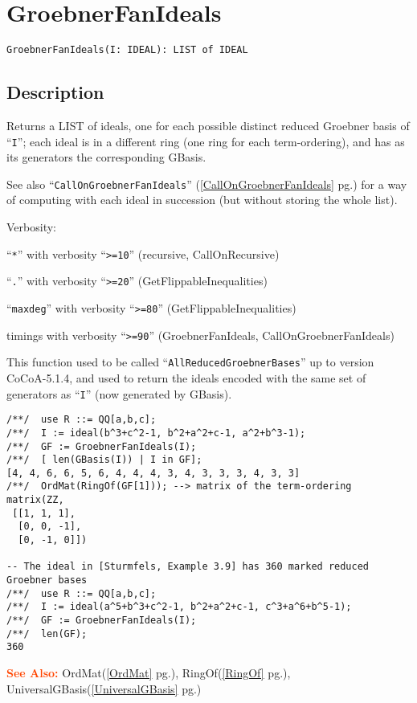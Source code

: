 \documentclass[a4paper]{mybook}
\newenvironment{command}{}{} %
\newcommand\SeeAlso{\par\textcolor{OrangeRed}{\textbf{\large See Also: }}}
\begin{document}
\section{GroebnerFanIdeals}
\label{GroebnerFanIdeals}
\begin{command} %


\begin{Verbatim}[label=syntax, rulecolor=\color{MidnightBlue},
frame=single]
GroebnerFanIdeals(I: IDEAL): LIST of IDEAL
\end{Verbatim}


\subsection*{Description}

Returns a LIST of ideals, one for each possible distinct reduced Groebner
basis of ``\verb&I&''; each ideal is in a different ring (one ring for each
term-ordering), and has as its generators the corresponding GBasis.
\par 
See also ``\verb&CallOnGroebnerFanIdeals&'' (\ref{CallOnGroebnerFanIdeals} pg.\pageref{CallOnGroebnerFanIdeals}) for a way of computing with each
ideal in succession (but without storing the whole list).
\par 
Verbosity:\par 
``\verb&*&'' with verbosity ``\verb&>=10&'' (recursive, CallOnRecursive)\par 
``\verb&.&'' with verbosity ``\verb&>=20&'' (GetFlippableInequalities)\par 
``\verb&maxdeg&'' with verbosity ``\verb&>=80&'' (GetFlippableInequalities)
\par 
timings with verbosity ``\verb&>=90&''  (GroebnerFanIdeals, CallOnGroebnerFanIdeals)
\par 
This function used to be called ``\verb&AllReducedGroebnerBases&''
up to version CoCoA-5.1.4, and used to return the ideals encoded with the
same set of generators as ``\verb&I&'' (now generated by GBasis).
\begin{Verbatim}[label=example, rulecolor=\color{PineGreen}, frame=single]
/**/  use R ::= QQ[a,b,c];
/**/  I := ideal(b^3+c^2-1, b^2+a^2+c-1, a^2+b^3-1);
/**/  GF := GroebnerFanIdeals(I);
/**/  [ len(GBasis(I)) | I in GF];
[4, 4, 6, 6, 5, 6, 4, 4, 4, 3, 4, 3, 3, 3, 4, 3, 3]
/**/  OrdMat(RingOf(GF[1])); --> matrix of the term-ordering
matrix(ZZ,
 [[1, 1, 1],
  [0, 0, -1],
  [0, -1, 0]])
  
-- The ideal in [Sturmfels, Example 3.9] has 360 marked reduced Groebner bases
/**/  use R ::= QQ[a,b,c];
/**/  I := ideal(a^5+b^3+c^2-1, b^2+a^2+c-1, c^3+a^6+b^5-1);
/**/  GF := GroebnerFanIdeals(I);
/**/  len(GF);
360
\end{Verbatim}


\SeeAlso %
  OrdMat(\ref{OrdMat} pg.\pageref{OrdMat}), 
    RingOf(\ref{RingOf} pg.\pageref{RingOf}), 
    UniversalGBasis(\ref{UniversalGBasis} pg.\pageref{UniversalGBasis})
\end{command} %
\end{document}

